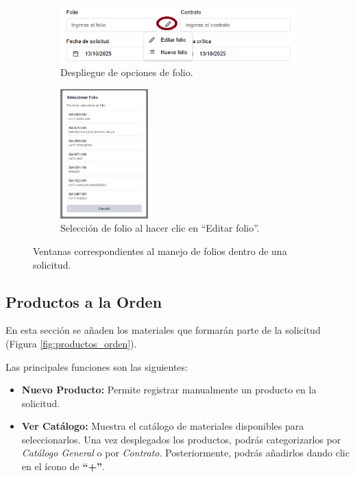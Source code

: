 \begin{figure}[ht!]
\centering
\begin{subfigure}{0.45\textwidth}
    \includegraphics{imgs/Almacen_General/Solicitudes_de_materia_SM/sm_folio.png}
    \caption{Despliegue de opciones de folio.}
    \label{fig:folio_opciones}
\end{subfigure}
\hfill
\begin{subfigure}{0.45\textwidth}
    \includegraphics[height=5cm]{imgs/Almacen_General/Solicitudes_de_materia_SM/sm_nuevo_folio.png}
    \caption{Selección de folio al hacer clic en “Editar folio”.}
    \label{fig:folio_editar}
\end{subfigure}        
\caption{Ventanas correspondientes al manejo de folios dentro de una solicitud.}
\label{fig:info_solicitud}
\end{figure}


\subsection{Productos a la Orden}

En esta sección se añaden los materiales que formarán parte de la solicitud (Figura \ref{fig:productos_orden}).  

Las principales funciones son las siguientes:

\begin{itemize}
    \item \textbf{Nuevo Producto:} Permite registrar manualmente un producto en la solicitud.
    \item \textbf{Ver Catálogo:} Muestra el catálogo de materiales disponibles para seleccionarlos.  
    Una vez desplegados los productos, podrás categorizarlos por \textit{Catálogo General} o por \textit{Contrato}.  
    Posteriormente, podrás añadirlos dando clic en el ícono de \textbf{“+”}.
\end{itemize}

